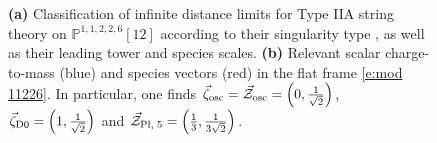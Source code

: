 \begin{figure}[htb]
	\begin{center}
        \quad
		\caption{\small \textbf{(a)} Classification of infinite distance limits for Type IIA string theory on $\mathbb{P}^{1,1,2,2,6}[12]$ according to their singularity type \cite{Corvilain:2018lgw}, as well as their leading tower and species scales. \textbf{(b)} Relevant scalar charge-to-mass (blue) and species vectors (red) in the flat frame \eqref{e:mod 11226}. In particular, one finds $\vec{\zeta}_{\rm osc}=\vec{\mathcal{Z}}_{\rm osc}=\left(0,\frac{1}{\sqrt{2}}\right)$, $\vec{\zeta}_{\rm D0}=\left(1,\frac{1}{\sqrt{2}}\right)$ and $\vec{\mathcal{Z}}_{\rm Pl,\; 5}=\left(\frac{1}{3}, \frac{1}{3\sqrt{2}}\right)$.}
		\label{fig:asympt lim  IIAP1126}
	\end{center}
\end{figure}	

